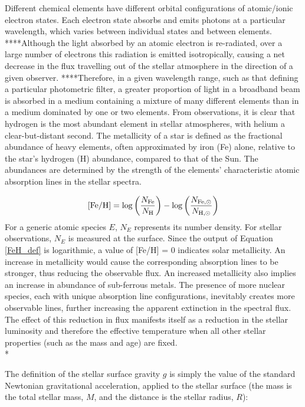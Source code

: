 \documentclass[12pt, a4paper]{report}
\begin{document}
Different chemical elements have different orbital configurations of atomic/ionic electron states. Each electron state absorbs and emits photons at a particular wavelength, which varies between individual states and between elements. ****Although the light absorbed by an atomic electron is re-radiated, over a large number of electrons this radiation is emitted isotropically, causing a net decrease in the flux travelling out of the stellar atmosphere in the direction of a given observer. ****Therefore, in a given wavelength range, such as that defining a particular photometric filter, a greater proportion of light in a broadband beam is absorbed in a medium containing a mixture of many different elements than in a medium dominated by one or two elements. From observations, it is clear that hydrogen is the most abundant element in stellar atmospheres, with helium a clear-but-distant second. The metallicity of a star is defined as the fractional abundance of heavy elements, often approximated by iron (Fe) alone, relative to the star's hydrogen (H) abundance, compared to that of the Sun. The abundances are determined by the strength of the elements' characteristic atomic absorption lines in the stellar spectra.

\begin{equation}
\textnormal{[Fe/H]} = \log\left(\frac{N_{\textnormal{Fe}}}{N_{\textnormal{H}}}\right) - \log\left(\frac{N_{\textnormal{Fe},\odot}}{N_{\textnormal{H},\odot}}\right)
\label{FeH_def}
\end{equation}
For a generic atomic species $E$, $N_{E}$ represents its number density. For stellar observations, $N_{E}$ is measured at the surface. Since the output of Equation \ref{FeH_def} is logarithmic, a value of [Fe/H] = 0 indicates solar metallicity. An increase in metallicity would cause the corresponding absorption lines to be stronger, thus reducing the observable flux. An increased metallicity also implies an increase in abundance of sub-ferrous metals. The presence of more nuclear species, each with unique absorption line configurations, inevitably creates more observable lines, further increasing the apparent extinction in the spectral flux. The effect of this reduction in flux manifests itself as a reduction in the stellar luminosity and therefore the effective temperature when all other stellar properties (such as the mass and age) are fixed.\\*

The definition of the stellar surface gravity $g$ is simply the value of the standard Newtonian gravitational acceleration, applied to the stellar surface (the mass is the total stellar mass, $M$, and the distance is the stellar radius, $R$):
\end{document}

